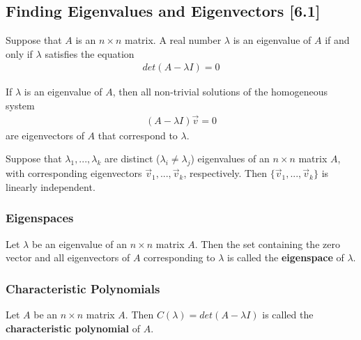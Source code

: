 \documentclass[a4paper,9pt]{extarticle}
\begin{document}
\begin{multicols*}{2}
\subsection{Finding Eigenvalues and Eigenvectors [6.1]}
Suppose that $A$ is an $n \times n$ matrix. A real number $\lambda$ is an eigenvalue of $A$ if and only if $\lambda$ satisfies the equation
\begin{equation} \label{6.1-1}
    \begin{split}
        det(A - \lambda I) = 0
    \end{split}
\end{equation}

If $\lambda$ is an eigenvalue of $A$, then all non-trivial solutions of the homogeneous system
\begin{equation} \label{6.1-2}
    \begin{split}
        (A - \lambda I) \vec{v} = 0
    \end{split}
\end{equation}
are eigenvectors of $A$ that correspond to $\lambda$.

Suppose that $\lambda_1, ..., \lambda_k$ are distinct ($\lambda_i \neq \lambda_j$) eigenvalues of an $n \times n$ matrix $A$, with corresponding eigenvectors $\vec{v}_1, ..., \vec{v}_k$, respectively. Then $\{\vec{v}_1, ..., \vec{v}_k\}$ is linearly independent.


\subsubsection{Eigenspaces}
Let $\lambda$ be an eigenvalue of an $n \times n$ matrix $A$. Then the set containing the zero vector and all eigenvectors of $A$ corresponding to $\lambda$ is called the \textbf{eigenspace} of $\lambda$.


\subsubsection{Characteristic Polynomials}
Let $A$ be an $n \times n$ matrix $A$. Then $C(\lambda) = det(A - \lambda I)$ is called the \textbf{characteristic polynomial} of $A$.



\end{multicols*}
\end{document}
